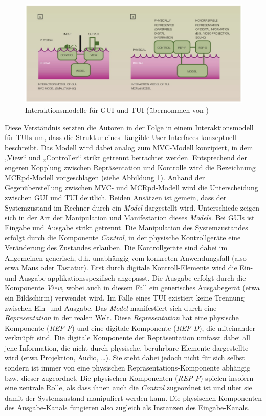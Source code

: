 \begin{figure}[htbp]
	\centering
		\includegraphics[width=12cm]{img/ImplementierungUeberblick/MCRpd.jpg}
	\caption[Interaktionsmodelle für GUI und TUI]{Interaktionsmodelle für GUI und TUI (übernommen von \citet{Ullmer00})}
	\label{fig:img_ImplementierungUeberblick_MCRpd}
\end{figure}

Diese Verständnis setzten die Autoren in der Folge in einem Interaktionsmodell für \glspl{TUI} um, dass die Struktur eines Tangible User Interfaces konzeptuell beschreibt. Das Modell wird dabei analog zum \gls{MVC}-Modell konzipiert, in dem „View“ und „Controller“ strikt getrennt betrachtet werden. Entsprechend der engeren Kopplung zwischen Repräsentation und Kontrolle wird die Bezeichnung \gls{MCRpd}-Modell vorgeschlagen (siehe Abbildung \ref{fig:img_ImplementierungUeberblick_MCRpd}). Anhand der Gegenüberstellung zwischen \gls{MVC}- und \gls{MCRpd}-Modell wird die Unterscheidung zwischen \gls{GUI} und \gls{TUI} deutlich. Beiden Ansätzen ist gemein, dass der Systemzustand im Rechner durch ein \emph{Model} dargestellt wird. Unterschiede zeigen sich in der Art der Manipulation und Manifestation dieses \emph{Models}. Bei \glspl{GUI} ist Eingabe und Ausgabe strikt getrennt. Die Manipulation des Systemzustandes erfolgt durch die Komponente \emph{Control}, in der physische Kontrollgeräte eine Veränderung des Zustandes erlauben. Die Kontrollgeräte sind dabei im Allgemeinen generisch, d.h. unabhängig vom konkreten Anwendungsfall (also etwa Maus oder Tastatur). Erst durch digitale Kontroll-Elemente wird die Ein- und Ausgabe applikationsspezifisch angepasst. Die Ausgabe erfolgt durch die Komponente \emph{View}, wobei auch in diesem Fall ein generisches Ausgabegerät (etwa ein Bildschirm) verwendet wird. Im Falle eines \gls{TUI} existiert keine Trennung zwischen Ein- und Ausgabe. Das \emph{Model} manifestiert sich durch eine \emph{Representation} in der realen Welt. Diese \emph{Representation} hat eine physische Komponente (\emph{REP-P}) und eine digitale Komponente (\emph{REP-D}), die miteinander verknüpft sind. Die digitale Komponente der Repräsentation umfasst dabei all jene Information, die nicht durch physische, berührbare Elemente dargestellte wird (etwa Projektion, Audio, \ldots). Sie steht dabei jedoch nicht für sich selbst sondern ist immer von eine physischen Repräsentations-Komponente abhängig bzw. dieser zugeordnet. Die physischen Komponenten (\emph{REP-P}) spielen insofern eine zentrale Rolle, als dass ihnen auch die \emph{Control} zugeordnet ist und über sie damit der Systemzustand manipuliert werden kann. Die physischen Komponenten des Ausgabe-Kanals fungieren also zugleich als Instanzen des Eingabe-Kanals.

